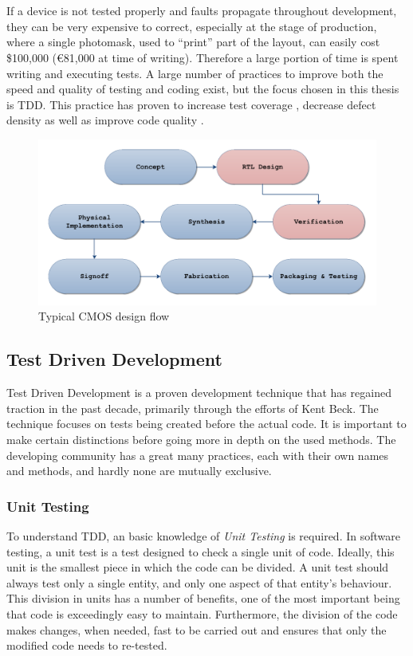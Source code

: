 \documentclass[11pt,british]{article}
\begin{document}
\\
\\
If a device is not tested properly and faults propagate throughout development, they can be very expensive to correct, especially at the stage of production, where a single photomask, used to ``print'' part of the layout, can easily cost \$100,000 (\euro81,000 at time of writing)\cite{weber06}. Therefore a large portion of time is spent writing and executing tests. A large number of practices to improve both the speed and quality of testing and coding exist, but the focus chosen in this thesis is \gls{TDD}. This practice has proven to increase test coverage \cite{Siniaalto:2007:CCS:1302496.1302946}, decrease defect density \cite{TDDinpractice} as well as improve code quality \cite{TDDinpractice,conf/isese/BhatN06}.

\begin{figure}[h]
    \centering
	\includegraphics[width=\textwidth]{images/VHDLflow.pdf}
    \caption{Typical CMOS design flow}
    \label{fig:Design_Flow}
\end{figure}


\subsection{Test Driven Development}
Test Driven Development is a proven development technique that has regained traction in the past decade, primarily through the efforts of Kent Beck\cite{VHDLUnit}. The technique focuses on tests being created before the actual code. It is important to make certain distinctions before going more in depth on the used methods. The developing community has a great many practices, each with their own names and methods, and hardly none are mutually exclusive.

\subsubsection{Unit Testing}
To understand \gls{TDD}, an basic knowledge of \emph{Unit Testing} is required. In software testing, a unit test is a test designed to check a single unit of code. Ideally, this unit is the smallest piece in which the code can be divided. A unit test should always test only a single entity, and only one aspect of that entity's behaviour. This division in units has a number of benefits, one of the most important being that code is exceedingly easy to maintain. Furthermore, the division of the code makes changes, when needed, fast to be carried out and ensures that only the modified code needs to re-tested.
\end{document}
